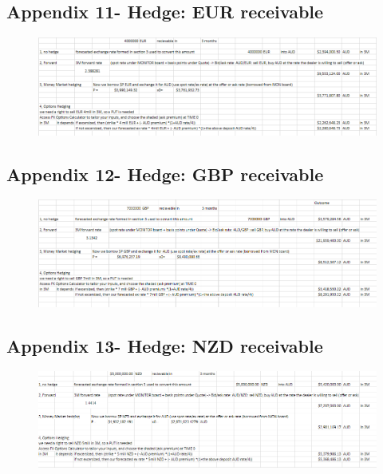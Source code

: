 \documentclass{article}
\let\Oldsubsection\subsection
\renewcommand{\subsection}{\FloatBarrier\Oldsubsection}
\begin{document}
\subsection*{Appendix 11- Hedge: EUR receivable}

\begin{figure}[h!]
    \centering
    \includegraphics[scale=0.5]{hedge/rec-EUR.png}
\end{figure}

\subsection*{Appendix 12- Hedge: GBP receivable}

\begin{figure}[h!]
    \centering
    \includegraphics[scale=0.5]{hedge/rec-GBP.png}
\end{figure}

\subsection*{Appendix 13- Hedge: NZD receivable}

\begin{figure}[h!]
    \centering
    \includegraphics[scale=0.5]{hedge/rec-NZD.png}
\end{figure}
\end{document}
